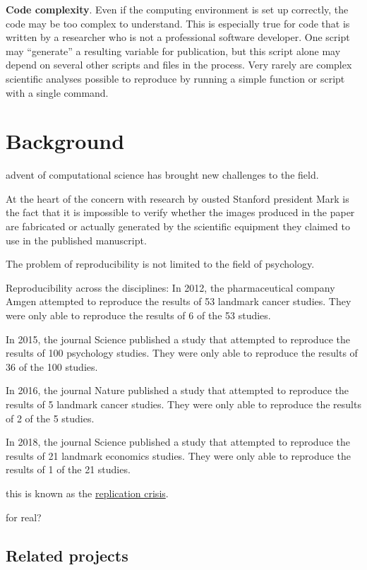 \textbf{Code complexity}. Even if the computing environment is set up correctly, the code may be too complex to understand. This is especially true for code that is written by a researcher who is not a professional software developer. One script may ``generate'' a resulting variable for publication, but this script alone may depend on several other scripts and files in the process. Very rarely are complex scientific analyses possible to reproduce by running a simple function or script with a single command.

\hypertarget{background}{%
\section{Background}\label{background}}

advent of computational science has brought new challenges to the field.

At the heart of the concern with research by ousted Stanford president Mark is the fact that it is impossible to verify whether the images produced in the paper are fabricated or actually generated by the scientific equipment they claimed to use in the published manuscript.

The problem of reproducibility is not limited to the field of psychology. 

Reproducibility across the disciplines:
In 2012, the pharmaceutical company Amgen attempted to reproduce the results of 53 landmark cancer studies. They were only able to reproduce the results of 6 of the 53 studies.

In 2015, the journal Science published a study that attempted to reproduce the results of 100 psychology studies. They were only able to reproduce the results of 36 of the 100 studies.

In 2016, the journal Nature published a study that attempted to reproduce the results of 5 landmark cancer studies. They were only able to reproduce the results of 2 of the 5 studies.

In 2018, the journal Science published a study that attempted to reproduce the results of 21 landmark economics studies. They were only able to reproduce the results of 1 of the 21 studies.

this is known as the \href{https://en.wikipedia.org/wiki/Replication\_crisis}{replication crisis}.

for real?

\hypertarget{related-projects}{%
\subsection{Related projects}\label{related-projects}}

